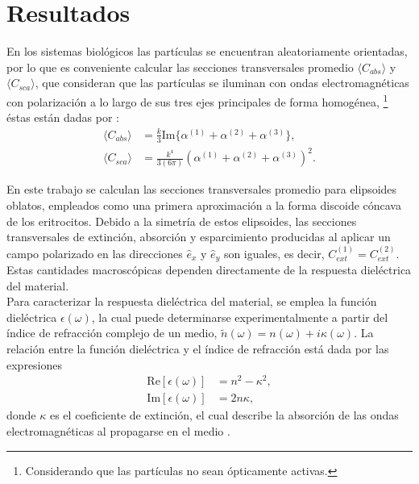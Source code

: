 \section{Resultados}
En los sistemas biológicos las partículas se encuentran aleatoriamente orientadas, por lo que es conveniente calcular las secciones transversales promedio $\langle C_{abs}\rangle$ y $\langle C_{sca}\rangle$, que consideran que las partículas se iluminan con ondas electromagnéticas con polarización a lo largo de sus tres ejes principales de forma homogénea, \footnote{Considerando que las partículas no sean ópticamente activas.} éstas están dadas por \cite{Bohren}:
\begin{align*}
	\langle C_{abs}\rangle &= \frac{k}{3} \text{Im}\{\alpha^{(1)}+\alpha^{(2)}+\alpha^{(3)}\},\\
	\langle C_{sca}\rangle &= \frac{k^4}{3(6\pi)} \left(\alpha^{(1)}+\alpha^{(2)}+\alpha^{(3)}\right)^2.
\end{align*}

En este trabajo se calculan las secciones transversales promedio para elipsoides oblatos, empleados como una primera aproximación a la forma discoide cóncava de los eritrocitos. Debido a la simetría de estos elipsoides, las secciones transversales de extinción, absorción y esparcimiento producidas al aplicar un campo  polarizado en las direcciones $\hat{e}_x$ y $\hat{e}_y$ son iguales, es decir, $C_{ext}^{(1)}=C_{ext}^{(2)}$. Estas cantidades macroscópicas dependen directamente de la respuesta dieléctrica del material.\\

Para caracterizar la respuesta dieléctrica del material, se emplea la función dieléctrica $\epsilon(\omega)$, la cual puede determinarse experimentalmente a partir del índice de refracción complejo de un medio, $\tilde{n}(\omega) = n(\omega) + i\kappa(\omega)$. La relación entre la función dieléctrica y el índice de refracción está dada por las expresiones \cite{Plasmonics}
\begin{align} 
	\text{Re}[\epsilon(\omega)] &= n^2 - \kappa^2,\\
	\text{Im}[\epsilon(\omega)] &= 2n\kappa, \end{align}
donde $\kappa$ es el coeficiente de extinción, el cual describe la absorción de las ondas electromagnéticas al propagarse en el medio \cite{Plasmonics}.\\


